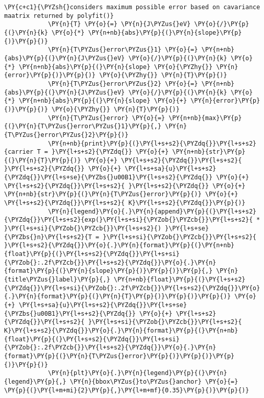 \begin{tcolorbox}[breakable, size=fbox, boxrule=1pt, pad at break*=1mm,colback=cellbackground, colframe=cellborder]
\begin{Verbatim}[commandchars=\\\{\}]
            \PY{c+c1}{\PYZsh{}considers maximum possible error based on cavariance maatrix returned by polyfit()}
            \PY{n}{T} \PY{o}{=} \PY{n}{J\PYZus{}eV} \PY{o}{/}\PY{p}{(}\PY{n}{k} \PY{o}{*} \PY{n+nb}{abs}\PY{p}{(}\PY{n}{slope}\PY{p}{)}\PY{p}{)}
            \PY{n}{T\PYZus{}error\PYZus{}1} \PY{o}{=} \PY{n+nb}{abs}\PY{p}{(}\PY{n}{J\PYZus{}eV} \PY{o}{/}\PY{p}{(}\PY{n}{k} \PY{o}{*} \PY{n+nb}{abs}\PY{p}{(}\PY{n}{slope} \PY{o}{\PYZhy{}} \PY{n}{error}\PY{p}{)}\PY{p}{)} \PY{o}{\PYZhy{}} \PY{n}{T}\PY{p}{)}
            \PY{n}{T\PYZus{}error\PYZus{}2} \PY{o}{=} \PY{n+nb}{abs}\PY{p}{(}\PY{n}{J\PYZus{}eV} \PY{o}{/}\PY{p}{(}\PY{n}{k} \PY{o}{*} \PY{n+nb}{abs}\PY{p}{(}\PY{n}{slope} \PY{o}{+} \PY{n}{error}\PY{p}{)}\PY{p}{)} \PY{o}{\PYZhy{}} \PY{n}{T}\PY{p}{)}
            \PY{n}{T\PYZus{}error} \PY{o}{=} \PY{n+nb}{max}\PY{p}{(}\PY{n}{T\PYZus{}error\PYZus{}1}\PY{p}{,} \PY{n}{T\PYZus{}error\PYZus{}2}\PY{p}{)}
            \PY{n+nb}{print}\PY{p}{(}\PY{l+s+s2}{\PYZdq{}}\PY{l+s+s2}{carrier T = }\PY{l+s+s2}{\PYZdq{}} \PY{o}{+} \PY{n+nb}{str}\PY{p}{(}\PY{n}{T}\PY{p}{)} \PY{o}{+} \PY{l+s+s2}{\PYZdq{}}\PY{l+s+s2}{ }\PY{l+s+s2}{\PYZdq{}} \PY{o}{+} \PY{l+s+sa}{u}\PY{l+s+s2}{\PYZdq{}}\PY{l+s+se}{\PYZbs{}u00B1}\PY{l+s+s2}{\PYZdq{}} \PY{o}{+} \PY{l+s+s2}{\PYZdq{}}\PY{l+s+s2}{ }\PY{l+s+s2}{\PYZdq{}} \PY{o}{+} \PY{n+nb}{str}\PY{p}{(}\PY{n}{T\PYZus{}error}\PY{p}{)} \PY{o}{+} \PY{l+s+s2}{\PYZdq{}}\PY{l+s+s2}{ K}\PY{l+s+s2}{\PYZdq{}}\PY{p}{)}
            \PY{n}{legend}\PY{o}{.}\PY{n}{append}\PY{p}{(}\PY{l+s+s2}{\PYZdq{}}\PY{l+s+s2}{exp(}\PY{l+s+si}{\PYZob{}\PYZcb{}}\PY{l+s+s2}{ * }\PY{l+s+si}{\PYZob{}\PYZcb{}}\PY{l+s+s2}{) }\PY{l+s+se}{\PYZbs{}n}\PY{l+s+s2}{T = }\PY{l+s+si}{\PYZob{}\PYZcb{}}\PY{l+s+s2}{ }\PY{l+s+s2}{\PYZdq{}}\PY{o}{.}\PY{n}{format}\PY{p}{(}\PY{n+nb}{float}\PY{p}{(}\PY{l+s+s2}{\PYZdq{}}\PY{l+s+si}{\PYZob{}:.2f\PYZcb{}}\PY{l+s+s2}{\PYZdq{}}\PY{o}{.}\PY{n}{format}\PY{p}{(}\PY{n}{slope}\PY{p}{)}\PY{p}{)}\PY{p}{,} \PY{n}{title\PYZus{}label}\PY{p}{,} \PY{n+nb}{float}\PY{p}{(}\PY{l+s+s2}{\PYZdq{}}\PY{l+s+si}{\PYZob{}:.2f\PYZcb{}}\PY{l+s+s2}{\PYZdq{}}\PY{o}{.}\PY{n}{format}\PY{p}{(}\PY{n}{T}\PY{p}{)}\PY{p}{)}\PY{p}{)} \PY{o}{+} \PY{l+s+sa}{u}\PY{l+s+s2}{\PYZdq{}}\PY{l+s+se}{\PYZbs{}u00B1}\PY{l+s+s2}{\PYZdq{}} \PY{o}{+} \PY{l+s+s2}{\PYZdq{}}\PY{l+s+s2}{ }\PY{l+s+si}{\PYZob{}\PYZcb{}}\PY{l+s+s2}{ K}\PY{l+s+s2}{\PYZdq{}}\PY{o}{.}\PY{n}{format}\PY{p}{(}\PY{n+nb}{float}\PY{p}{(}\PY{l+s+s2}{\PYZdq{}}\PY{l+s+si}{\PYZob{}:.2f\PYZcb{}}\PY{l+s+s2}{\PYZdq{}}\PY{o}{.}\PY{n}{format}\PY{p}{(}\PY{n}{T\PYZus{}error}\PY{p}{)}\PY{p}{)}\PY{p}{)}\PY{p}{)}
            \PY{n}{plt}\PY{o}{.}\PY{n}{legend}\PY{p}{(}\PY{n}{legend}\PY{p}{,} \PY{n}{bbox\PYZus{}to\PYZus{}anchor} \PY{o}{=} \PY{p}{(}\PY{l+m+mi}{2}\PY{p}{,}\PY{l+m+mf}{0.35}\PY{p}{)}\PY{p}{)}

\end{Verbatim}
\end{tcolorbox}
